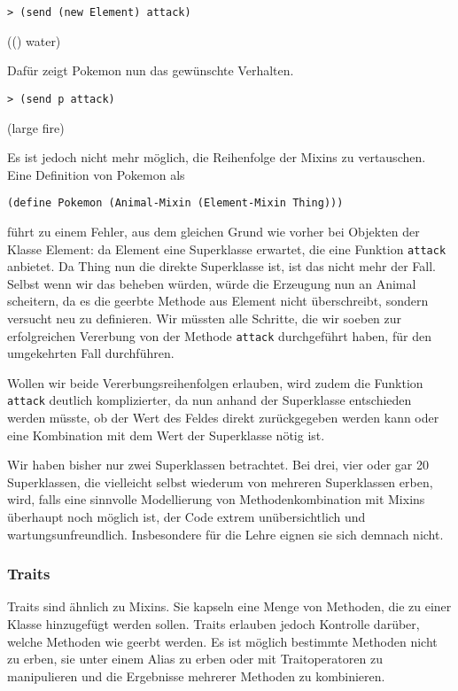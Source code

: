 \begin{lstlisting}
> (send (new Element) attack)
\end{lstlisting}
{\rsymbol (() water)}

Dafür zeigt Pokemon nun das gewünschte Verhalten.
\begin{lstlisting}
> (send p attack)
\end{lstlisting}
{\rsymbol (large fire)}

Es ist jedoch nicht mehr möglich, die Reihenfolge der Mixins zu vertauschen. Eine Definition von Pokemon als

\begin{lstlisting}
(define Pokemon (Animal-Mixin (Element-Mixin Thing)))
\end{lstlisting}

führt zu einem Fehler, aus dem gleichen Grund wie vorher bei Objekten der Klasse Element: da Element eine Superklasse erwartet, die eine Funktion \texttt{attack} anbietet. Da Thing nun die direkte Superklasse ist, ist das nicht mehr der Fall. Selbst wenn wir das beheben würden, würde die Erzeugung nun an Animal scheitern, da es die geerbte Methode aus Element nicht überschreibt, sondern versucht neu zu definieren. Wir müssten alle Schritte, die wir soeben zur erfolgreichen Vererbung von der Methode \texttt{attack} durchgeführt haben, für den umgekehrten Fall durchführen. 

Wollen wir beide Vererbungsreihenfolgen erlauben, wird zudem die Funktion \texttt{attack} deutlich komplizierter, da nun anhand der Superklasse entschieden werden müsste, ob der Wert des Feldes direkt zurückgegeben werden kann oder eine Kombination mit dem Wert der Superklasse nötig ist.

Wir haben bisher nur zwei Superklassen betrachtet. Bei drei, vier oder gar 20 Superklassen, die vielleicht selbst wiederum von mehreren Superklassen erben, wird, falls eine sinnvolle Modellierung von Methodenkombination mit Mixins überhaupt noch möglich ist, der Code extrem unübersichtlich und wartungsunfreundlich. Insbesondere für die Lehre eignen sie sich demnach nicht.

\subsubsection{Traits}
Traits sind ähnlich zu Mixins. Sie kapseln eine Menge von Methoden, die zu einer Klasse hinzugefügt werden sollen. Traits erlauben jedoch Kontrolle darüber, welche Methoden wie geerbt werden. Es ist möglich bestimmte Methoden nicht zu erben, sie unter einem Alias zu erben oder mit Traitoperatoren zu manipulieren und die Ergebnisse mehrerer Methoden zu kombinieren.

